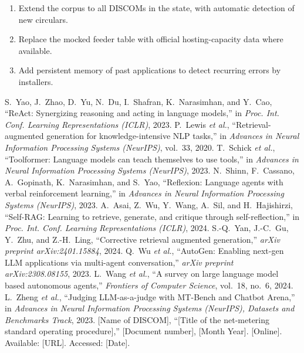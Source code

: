 \documentclass[12pt,a4paper,oneside]{report}
\newif\ifguidance
\newcommand{\guide}[1]{%
  \ifguidance
  \begin{tcolorbox}[enhanced,breakable,colback=guidebg,colframe=bmsblue,
    boxrule=0.6pt,arc=2pt,left=6pt,right=6pt,top=4pt,bottom=4pt,
    fonttitle=\bfseries\small,title={What to write here},
    before upper={\small\setstretch{1.1}}]
  #1
  \end{tcolorbox}
  \fi}
\newenvironment{sample}
  {\par\noindent{\footnotesize\bfseries\textcolor{BrickRed}{[SAMPLE --- replace with your own content]}}\par\color{samplecol}}
  {\par\medskip}
\begin{document}
\begin{sample}
\begin{enumerate}[itemsep=1pt]
\item Extend the corpus to all DISCOMs in the state, with automatic detection of new circulars.
\item Replace the mocked feeder table with official hosting-capacity data where available.
\item Add persistent memory of past applications to detect recurring errors by installers.
\end{enumerate}
\end{sample}


\guide{Use IEEE style. Cite at least 10 sources. Every reference must be cited in the text, and every
citation must appear here. Prefer papers, official documents and documentation over blogs. The entries
below are real works you may cite if you use them; delete those you do not cite.}
\begin{thebibliography}{99}
 S.~Yao, J.~Zhao, D.~Yu, N.~Du, I.~Shafran, K.~Narasimhan, and Y.~Cao,
``ReAct: Synergizing reasoning and acting in language models,'' in \emph{Proc. Int. Conf. Learning
Representations (ICLR)}, 2023.
 P.~Lewis \emph{et al.}, ``Retrieval-augmented generation for knowledge-intensive
NLP tasks,'' in \emph{Advances in Neural Information Processing Systems (NeurIPS)}, vol.~33, 2020.
 T.~Schick \emph{et al.}, ``Toolformer: Language models can teach
themselves to use tools,'' in \emph{Advances in Neural Information Processing Systems (NeurIPS)}, 2023.
 N.~Shinn, F.~Cassano, A.~Gopinath, K.~Narasimhan, and S.~Yao,
``Reflexion: Language agents with verbal reinforcement learning,'' in \emph{Advances in Neural
Information Processing Systems (NeurIPS)}, 2023.
 A.~Asai, Z.~Wu, Y.~Wang, A.~Sil, and H.~Hajishirzi, ``Self-RAG: Learning to
retrieve, generate, and critique through self-reflection,'' in \emph{Proc. Int. Conf. Learning
Representations (ICLR)}, 2024.
 S.-Q.~Yan, J.-C.~Gu, Y.~Zhu, and Z.-H.~Ling, ``Corrective retrieval augmented
generation,'' \emph{arXiv preprint arXiv:2401.15884}, 2024.
 Q.~Wu \emph{et al.}, ``AutoGen: Enabling next-gen LLM applications via
multi-agent conversation,'' \emph{arXiv preprint arXiv:2308.08155}, 2023.
 L.~Wang \emph{et al.}, ``A survey on large language model based autonomous
agents,'' \emph{Frontiers of Computer Science}, vol.~18, no.~6, 2024.
 L.~Zheng \emph{et al.}, ``Judging LLM-as-a-judge with MT-Bench and Chatbot
Arena,'' in \emph{Advances in Neural Information Processing Systems (NeurIPS), Datasets and Benchmarks
Track}, 2023.
 [Name of DISCOM], ``[Title of the net-metering standard operating procedure],''
[Document number], [Month Year]. [Online]. Available: [URL]. Accessed: [Date].
\end{thebibliography}
\end{document}

